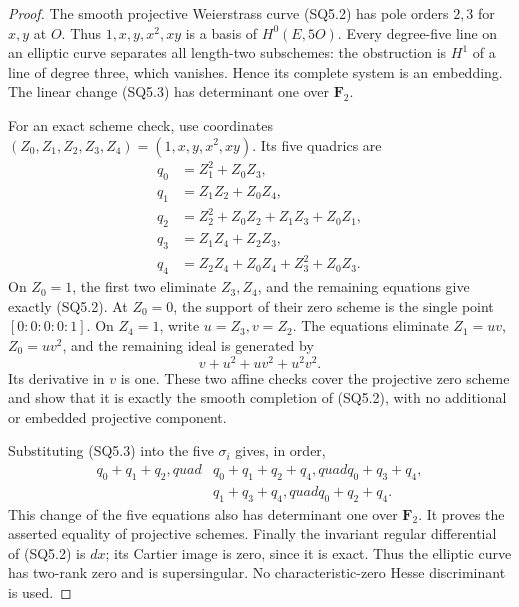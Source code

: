 \begin{proof}
The smooth projective Weierstrass curve (SQ5.2) has pole orders
\(2,3\) for \(x,y\) at \(O\). Thus
\(1,x,y,x^2,xy\) is a basis of \(H^0(E,5O)\).
Every degree-five line on an elliptic curve separates all
length-two subschemes: the obstruction is \(H^1\) of a line
of degree three, which vanishes. Hence its complete system is
an embedding. The linear change (SQ5.3) has determinant one
over \(\mathbf F_2\).

For an exact scheme check, use coordinates
\((Z_0,Z_1,Z_2,Z_3,Z_4)=(1,x,y,x^2,xy)\). Its five quadrics are
\[
 \begin{split}
 q_0&=Z_1^2+Z_0Z_3,\\
 q_1&=Z_1Z_2+Z_0Z_4,\\
 q_2&=Z_2^2+Z_0Z_2+Z_1Z_3+Z_0Z_1,\\
 q_3&=Z_1Z_4+Z_2Z_3,\\
 q_4&=Z_2Z_4+Z_0Z_4+Z_3^2+Z_0Z_3.
 \end{split}                                      \tag{SQ5.4}
\]
On \(Z_0=1\), the first two eliminate \(Z_3,Z_4\), and
the remaining equations give exactly (SQ5.2). At \(Z_0=0\),
the support of their zero scheme is the single point
\([0:0:0:0:1]\). On \(Z_4=1\), write \(u=Z_3,v=Z_2\).
The equations eliminate
\(Z_1=uv\), \(Z_0=uv^2\), and the remaining ideal is generated by
\[
                    v+u^2+uv^2+u^2v^2.            \tag{SQ5.5}
\]
Its derivative in \(v\) is one. These two affine checks cover
the projective zero scheme and show that it is exactly the smooth
completion of (SQ5.2), with no additional or embedded projective
component.

Substituting (SQ5.3) into the five \(\sigma_i\) gives, in order,
\[
 \begin{split}
 q_0+q_1+q_2,quad&q_0+q_1+q_2+q_4,quad q_0+q_3+q_4,\\
 &q_1+q_3+q_4,quad q_0+q_2+q_4.
 \end{split}                                      \tag{SQ5.6}
\]
This change of the five equations also has determinant one over
\(\mathbf F_2\). It proves the asserted equality of projective
schemes. Finally the invariant regular differential of (SQ5.2)
is \(dx\); its Cartier image is zero, since it is exact.
Thus the elliptic curve has two-rank zero and is supersingular.
No characteristic-zero Hesse discriminant is used.
\end{proof}


